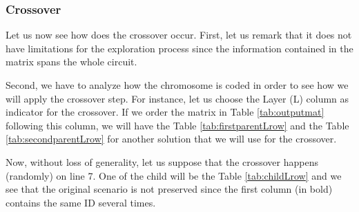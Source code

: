 \subsubsection*{Crossover}

Let us now see how does the crossover occur. First, let us remark that it does not have limitations for the exploration process since the information contained in the matrix spans the whole circuit.

Second, we have to analyze how the chromosome is coded in order to see how we will apply the crossover step. For instance, let us choose the Layer (L) column as indicator for the crossover. If we order the matrix in Table \ref{tab:outputmat} following this column, we will have the Table \ref{tab:firstparentLrow} and the Table \ref{tab:secondparentLrow} for another solution that we will use for the crossover.

Now, without loss of generality, let us suppose that the crossover happens (randomly) on line 7. One of the child will be the Table \ref{tab:childLrow} and we see that the original scenario is not preserved since the first column (in bold) contains the same ID several times.

